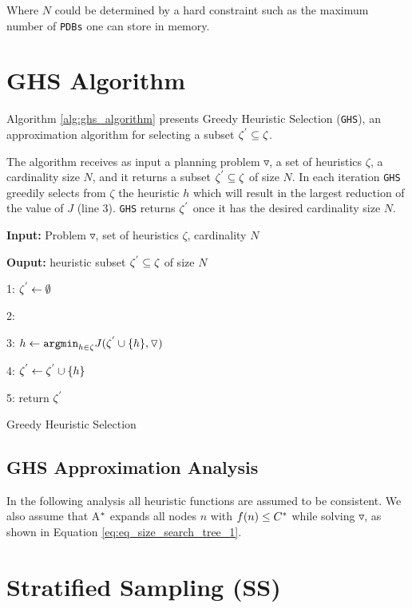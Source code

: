 Where $N$ could be determined by a hard constraint such as the maximum number of \texttt{PDBs} one can store in memory.

\section{GHS Algorithm}
\noindent
Algorithm \ref{alg:ghs_algorithm} presents Greedy Heuristic Selection (\texttt{GHS}), an approximation algorithm for selecting a subset $\zeta\sp{'} \subseteq \zeta$.

The algorithm receives as input a planning problem $\triangledown$, a set of heuristics $\zeta$, a cardinality size $N$, and it returns a subset $\zeta\sp{'} \subseteq \zeta$ of size $N$. In each iteration \texttt{GHS} greedily selects from $\zeta$ the heuristic $h$ which will result in the largest reduction of the value of $J$ (line 3). \texttt{GHS} returns $\zeta\sp{'}$ once it has the desired cardinality size $N$.\\

\begin{algorithm}[H]
 
 \textbf{Input:} Problem $\triangledown$, set  of heuristics $\zeta$, cardinality $N$
 
 \textbf{Ouput:} heuristic subset $\zeta\sp{'} \subseteq \zeta$ of size $N$
 
 1:  $\zeta\sp{'} \leftarrow \emptyset$
 
 2:   {
 
 3:  $h \leftarrow \texttt{argmin}_{h \in \zeta} J(\zeta\sp{'} \cup \{h\}, \triangledown) $
 
 4: $\zeta\sp{'} \leftarrow \zeta\sp{'} \cup \{h\}$
 
 5: return $\zeta\sp{'}$
 }
 \caption{Greedy Heuristic Selection}
 \label{alg:ghs_algorithm}
\end{algorithm}

\subsection{GHS Approximation Analysis}
In the following analysis all heuristic functions are assumed to be consistent. We also assume that A$\sp{*}$ expands all nodes $n$ with $f(n) \leq C\sp{*}$ while solving $\triangledown$, as shown in Equation \eqref{eq:eq_size_search_tree_1}.

\section{Stratified Sampling (SS)}

